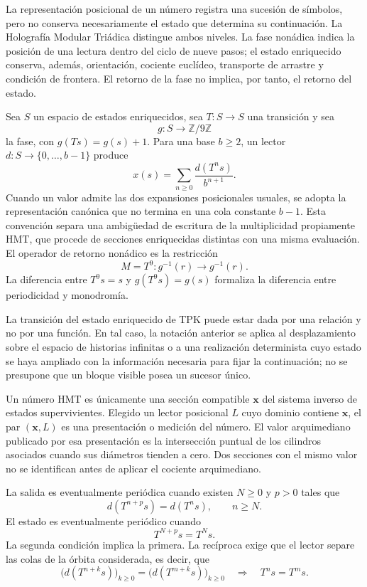 \label{chap:taxonomia-monodromia}

La representación posicional de un número registra una sucesión de símbolos,
pero no conserva necesariamente el estado que determina su continuación. La
Holografía Modular Triádica distingue ambos niveles. La fase nonádica indica
la posición de una lectura dentro del ciclo de nueve pasos; el estado
enriquecido conserva, además, orientación, cociente euclídeo, transporte de
arrastre y condición de frontera. El retorno de la fase no implica, por
tanto, el retorno del estado.

Sea \(S\) un espacio de estados enriquecidos, sea
\(T:S\to S\) una transición y sea
\[
g:S\longrightarrow\mathbb Z/9\mathbb Z
\]
la fase, con \(g(Ts)=g(s)+1\). Para una base \(b\geq2\), un lector
\(d:S\to\{0,\ldots,b-1\}\) produce
\[
x(s)=\sum_{n\geq0}\frac{d(T^ns)}{b^{n+1}}.
\]
Cuando un valor admite las dos expansiones posicionales usuales, se adopta la
representación canónica que no termina en una cola constante \(b-1\). Esta
convención separa una ambigüedad de escritura de la multiplicidad propiamente
HMT, que procede de secciones enriquecidas distintas con una misma
evaluación.
El operador de retorno nonádico es la restricción
\[
M=T^9:g^{-1}(r)\longrightarrow g^{-1}(r).
\]
La diferencia entre \(T^9s=s\) y \(g(T^9s)=g(s)\) formaliza la diferencia
entre periodicidad y monodromía.

La transición del estado enriquecido de TPK puede estar dada por una relación y no por una
función. En tal caso, la notación anterior se aplica al desplazamiento sobre
el espacio de historias infinitas o a una realización determinista cuyo estado
se haya ampliado con la información necesaria para fijar la continuación; no se
presupone que un bloque visible posea un sucesor único.

\begin{definition}
Un número HMT es únicamente una sección compatible
\(\boldsymbol x\) del sistema inverso de estados supervivientes. Elegido un
lector posicional \(L\) cuyo dominio contiene \(\boldsymbol x\), el par
\((\boldsymbol x,L)\) es una presentación o medición del número. El valor
arquimediano publicado por esa presentación es la intersección puntual de los
cilindros asociados cuando sus diámetros tienden a cero. Dos secciones con el
mismo valor no se identifican antes de aplicar el cociente arquimediano.
\end{definition}

\begin{definition}
La salida es eventualmente periódica cuando existen \(N\geq0\) y \(p>0\)
tales que
\[
d(T^{n+p}s)=d(T^ns),\qquad n\geq N.
\]
El estado es eventualmente periódico cuando
\[
T^{N+p}s=T^Ns.
\]
La segunda condición implica la primera. La recíproca exige que el lector
separe las colas de la órbita considerada, es decir, que
\[
 \bigl(d(T^{n+k}s)\bigr)_{k\geq0}
 =\bigl(d(T^{m+k}s)\bigr)_{k\geq0}
 \quad\Longrightarrow\quad T^ns=T^ms.
\]
\end{definition}


